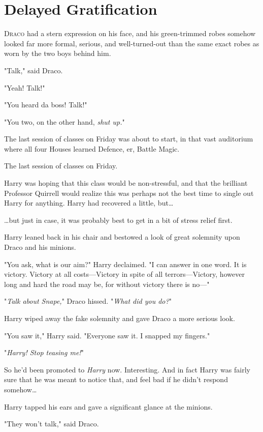 \chapter{Delayed Gratification}

\lettrine{D}{raco} had a stern expression on his face, and his green-trimmed robes somehow
looked far more formal, serious, and well-turned-out than the same exact robes
as worn by the two boys behind him.

"Talk," said Draco.

"Yeah! Talk!"

"You heard da boss! Talk!"

"You two, on the other hand, \emph{shut up.}"

The last session of classes on Friday was about to start, in that vast
auditorium where all four Houses learned Defence, er, Battle Magic.

The last session of classes on Friday.

Harry was hoping that this class would be non-stressful, and that the brilliant
Professor Quirrell would realize this was perhaps not the best time to single
out Harry for anything. Harry had recovered a little, but{\ldots}

{\ldots}but just in case, it was probably best to get in a bit of stress relief
first.

Harry leaned back in his chair and bestowed a look of great solemnity upon
Draco and his minions.

"You ask, what is our aim?" Harry declaimed. "I can answer in one word. It is
victory. Victory at all costs---Victory in spite of all terrors---Victory,
however long and hard the road may be, for without victory there is no---"

"\emph{Talk about Snape,}" Draco hissed. "\emph{What did you do?}"

Harry wiped away the fake solemnity and gave Draco a more serious look.

"You saw it," Harry said. "Everyone saw it. I snapped my fingers."

"\emph{Harry! Stop teasing me!}"

So he'd been promoted to \emph{Harry} now. Interesting. And in fact Harry was
fairly sure that he was meant to notice that, and feel bad if he didn't respond
somehow{\ldots}

Harry tapped his ears and gave a significant glance at the minions.

"They won't talk," said Draco.

